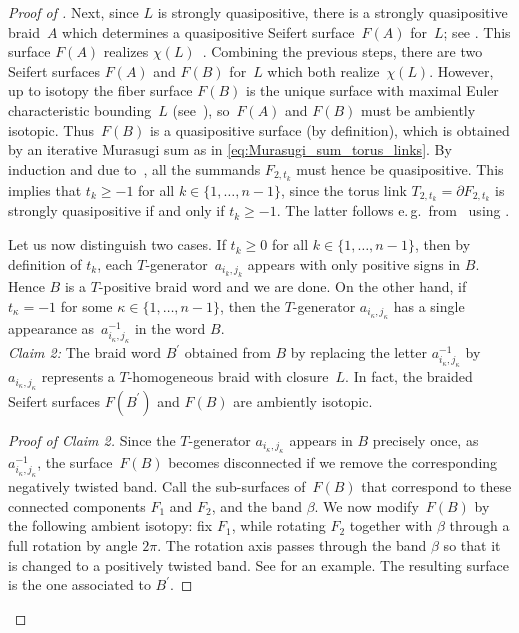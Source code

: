 \documentclass{amsart}
\theoremstyle{definition}
\theoremstyle{remark}
\theoremstyle{plain}
\newcommand{\eg}{e.\,g.~}
\begin{document}
\begin{proof}[{Proof of }]
Next, since $L$ is strongly quasipositive, there is a strongly quasipositive braid~$A$ which determines a quasipositive Seifert surface~$F(A)$ for~$L$; see . This surface $F(A)$ realizes $\chi(L)$~\cite{bennequin}. Combining the previous steps, there are two Seifert surfaces $F(A)$ and $F(B)$ for~$L$ which both realize~$\chi(L)$. However, up to isotopy the fiber surface $F(B)$ is the unique surface with maximal Euler characteristic bounding~$L$ (see~\cite[Proposition 2.19]{rudolph_handbook}), so~$F(A)$ and $F(B)$ must be ambiently isotopic. Thus~$F(B)$ is a quasipositive surface (by definition), which is obtained by an iterative Murasugi sum as in \eqref{eq:Murasugi_sum_torus_links}. By induction and  due to~\cite{Rudolph_V}, all the summands $F_{2,t_k}$ must hence be quasipositive. This implies that $t_k \geq -1$ for all $k \in \{1,\dots,n-1\}$, since the torus link $T_{2,t_k} = \partial F_{2,t_k}$ is strongly quasipositive if and only if $t_k \geq -1$. The latter follows \eg from~\cite{Traczyk} using .

Let us now distinguish two cases. If $t_k \geq 0$ for all $k \in \{1,\dots,n-1\}$, then by definition of $t_k$, each $T$-generator~$a_{i_k,j_k}$ appears with only positive signs in $B$. Hence $B$ is a $T$-positive braid word and we are done. On the other hand, if $t_{\kappa} =-1$ for some $\kappa \in \{1,\dots,n-1\}$, then the $T$-generator $a_{i_\kappa,j_\kappa}$ has a single appearance as~$a_{i_\kappa,j_\kappa}^{-1}$ in the word $B$.\\

\emph{Claim 2:} The braid word $B^\prime$ obtained from $B$ by replacing the letter $a_{i_\kappa,j_\kappa}^{-1}$ by~$a_{i_\kappa,j_\kappa}$ represents a $T$-homogeneous braid with closure~$L$. In fact, the braided Seifert surfaces $F(B^\prime)$ and $F(B)$ are ambiently isotopic. 

\begin{proof}[Proof of Claim 2]
Since the $T$-generator $a_{i_\kappa,j_\kappa}$ appears in $B$ precisely once, as~$a_{i_\kappa,j_\kappa}^{-1}$, the surface~$F(B)$ becomes disconnected if we remove the corresponding negatively twisted band. Call the sub-surfaces of~$F(B)$ that correspond to these connected components $F_1$ and $F_2$, and the band $\beta$. We now modify~$F(B)$ by the following ambient isotopy: fix $F_1$, while rotating $F_2$ together with $\beta$ through a full rotation by angle $2 \pi$. The rotation axis passes through the band $\beta$ so that it is changed to a positively twisted band. See  for an example. 
The resulting surface is the one associated to $B^\prime$.
\end{proof}


\end{proof}
\end{document}
